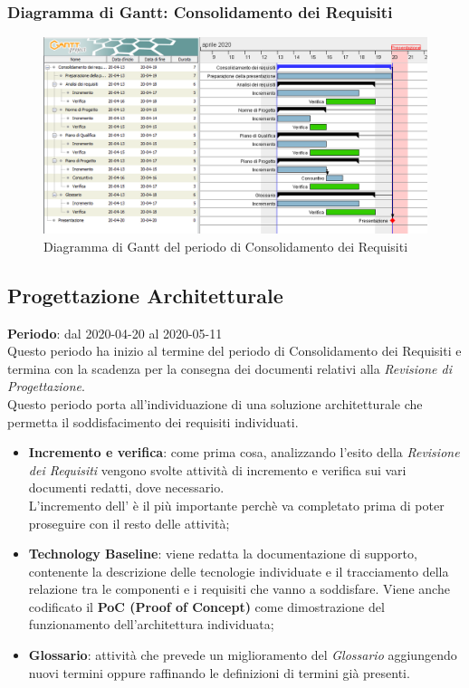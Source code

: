 	\subsubsection{Diagramma di Gantt: Consolidamento dei Requisiti}
		\begin{figure}[h]
			\centering
			\includegraphics[width=1.1\textwidth]{./res/img/DiagrammiGantt/cons_req_gantt.png}
			\caption{Diagramma di Gantt del periodo di Consolidamento dei Requisiti}
		\end{figure}
\newpage
\subsection{Progettazione Architetturale}
\textbf{Periodo}: dal 2020-04-20 al 2020-05-11 \\
Questo periodo ha inizio al termine del periodo di Consolidamento dei Requisiti e termina con la scadenza per la consegna dei documenti relativi alla \textit{Revisione di Progettazione}. \\
Questo periodo porta all'individuazione di una soluzione architetturale che permetta il soddisfacimento dei requisiti individuati.
\begin{itemize}
	\item \textbf{Incremento e verifica}: come prima cosa, analizzando l'esito della \textit{Revisione dei Requisiti} vengono svolte attività di incremento e verifica sui vari documenti redatti, dove necessario. \\
	L'incremento dell'\textit{\AdR{}} è il più importante perchè va completato prima di poter proseguire con il resto delle attività;
	\item \textbf{Technology Baseline}: viene redatta la documentazione di supporto, contenente la descrizione delle tecnologie individuate e il tracciamento della relazione tra le componenti e i requisiti che vanno a soddisfare. Viene anche codificato il \textbf{PoC (Proof of Concept)} come dimostrazione del funzionamento dell'architettura individuata;
	\item \textbf{Glossario}: attività che prevede un miglioramento del \textit{Glossario} aggiungendo nuovi termini oppure raffinando le definizioni di termini già presenti.
\end{itemize}
